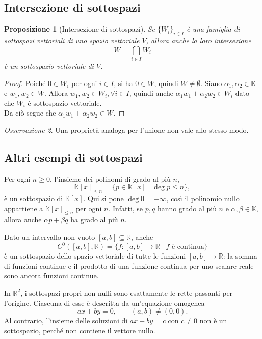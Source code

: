 \documentclass[11pt,a4paper]{article}
\newcommand{\RR}{\mathbb{R}}
\newcommand{\KK}{\mathbb{K}}
\theoremstyle{plain}
\newtheorem{prop}{Proposizione}[section]
\theoremstyle{definition}
\theoremstyle{remark}
\newtheorem{oss}[prop]{Osservazione}
\begin{document}
\subsection{Intersezione di sottospazi}

\begin{prop}[Intersezione di sottospazi]
Se $\{W_i\}_{i\in I}$ è una famiglia di sottospazi vettoriali di uno spazio vettoriale $V$, allora anche la loro intersezione
\[
  W = \bigcap_{i\in I}W_i
\]
è un sottospazio vettoriale di $V$.
\end{prop}
\begin{proof}
    Poiché $0\in W_i$ per ogni $i\in I$, si ha $0\in W$, quindi $W\neq\emptyset$.
    Siano $\alpha_1,\alpha_2\in \KK$ e $w_1,w_2\in W.$ Allora $w_1,w_2\in W_i ,\forall i \in I$, quindi anche $\alpha_1w_1+\alpha_2w_2 \in W_i $ dato che $W_i$ è sottospazio vettoriale.\\Da ciò segue che $\alpha_1w_1+\alpha_2w_2 \in W$.
\end{proof}
\begin{oss}
    Una proprietà analoga per l'unione non vale allo stesso modo.
\end{oss}

\subsection{Altri esempi di sottospazi}

Per ogni $n\geq 0$, l'insieme dei polinomi di grado al più $n$,
\[
  \KK[x]_{\leq n}=\{p\in\KK[x]\mid \deg p\leq n\},
\]
è un sottospazio di $\KK[x]$. Qui si pone $\deg 0=-\infty$, così il polinomio nullo appartiene a $\KK[x]_{\leq n}$ per ogni $n$. Infatti, se $p,q$ hanno grado al più $n$ e $\alpha,\beta\in\KK$, allora anche $\alpha p+\beta q$ ha grado al più $n$.

Dato un intervallo non vuoto $[a,b]\subseteq\RR$, anche
\[
 C^0([a,b],\RR)=\{f:[a,b]\to\RR\mid f\text{ è continua}\}
\]
è un sottospazio dello spazio vettoriale di tutte le funzioni $[a,b]\to\RR$: la somma di funzioni continue e il prodotto di una funzione continua per uno scalare reale sono ancora funzioni continue.

In $\RR^2$, i sottospazi propri non nulli sono esattamente le rette passanti per l'origine. Ciascuna di esse è descritta da un'equazione omogenea
\[
 ax+by=0,\qquad (a,b)\neq(0,0).
\]
Al contrario, l'insieme delle soluzioni di $ax+by=c$ con $c\neq0$ non è un sottospazio, perché non contiene il vettore nullo.
\end{document}
